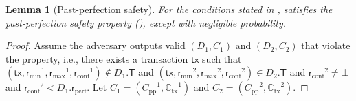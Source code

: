 \documentclass[pdflatex,sn-mathphys-num]{sn-jnl}%
\theoremstyle{thmstyleone}%
\theoremstyle{thmstyletwo}%
\theoremstyle{thmstylethree}%
\newtheorem{lemma}{Lemma}
\newcommand{\wip}[1]{{\textcolor{red}{TODO: #1}}}
\newcommand{\op}[1]{\textsl{#1}}
\newcommand{\opread}[1]{\op{read}(#1)\xspace}
\newcommand{\operand}[1]{\textsf{#1}}
\newcommand{\tx}{\operand{tx}\xspace}
\newcommand{\round}{\operand{r}\xspace}
\newcommand{\rconf}{\ensuremath{\round_\text{conf}}\xspace}
\newcommand{\rmin}{\ensuremath{\round_\text{min}}\xspace}
\newcommand{\rmax}{\ensuremath{\round_\text{max}}\xspace}
\newcommand{\rperf}{\ensuremath{\round_\text{perf}}\xspace}
\newcommand{\transactions}{\operand{\wip{obsolete}}\xspace}
\newcommand{\tsps}{\operand{tsps}\xspace}
\newcommand{\alltxcert}{\ensuremath{\mathbb{C}_\text{tx}}\xspace}
\newcommand{\ppcert}{\ensuremath{C_\text{pp}}\xspace}
\newcommand{\cert}{\ensuremath{C}\xspace}
\newcommand{\txSet}{\operand{T}\xspace}
\newcommand{\Pod}{\ensuremath{D}\xspace}
\newcommand{\confirmed}{confirmed\xspace}
\begin{document}
\begin{appendices}
\begin{lemma}[Past-perfection safety]\label{lem:pod-pp-safety}
	For the conditions stated in ,  satisfies the \emph{past-perfection} safety property (), except with negligible probability.
\end{lemma}
\begin{proof}
	Assume the adversary outputs valid $(\Pod_1, \cert_1)$ and $(\Pod_2, \cert_2)$ that violate the property,
	i.e., there exists a transaction $\tx$ such that $(\tx, \rmin^1, \rmax^1, \rconf^1) \not\in \Pod_1.\txSet$ and $(\tx, \rmin^2, \rmax^2, \rconf^2) \in \Pod_2.\txSet$ and $\rconf^2 \neq \bot$ and $\rconf^2 < \Pod_1.\rperf$.
	Let $\cert_1 = (\ppcert^1, \alltxcert^1)$ and $\cert_2 = (\ppcert^2, \alltxcert^2)$.


\end{proof}
\end{appendices}
\end{document}
